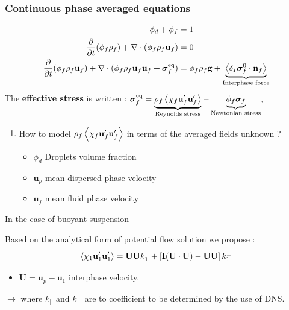 \documentclass{sintefbeamer}
\begin{document}
\begin{frame}
  \frametitle{Continuous phase averaged equations }
\begin{align*}
  \phi_d + \phi_f &= 1\\
  \frac{\partial}{\partial t} (\phi_f \rho_f)  
  + \mathbf{\nabla}\cdot (\phi_f \rho_f\textbf{u}_f)
  &= 
  0\\
  \frac{\partial}{\partial t} (\phi_f \rho_f\textbf{u}_f)  
  + \mathbf{\nabla}\cdot (
      \phi_f \rho_f\textbf{u}_f\textbf{u}_f
      + \bm{\sigma}_f^\text{eq}
  )
  &= 
  \phi_f  \rho_f \textbf{g}
  + 
  \underbrace{
    \left<\delta_I \bm{\sigma}_f^0 \cdot \textbf{n}_f\right>
  }_\text{Interphase force}
\end{align*}
The \textbf{effective stress} is written :
$
  \bm{\sigma}_f^\text{eq}
  = 
   \underbrace{\rho_f\left<\chi_f \textbf{u}_f'\textbf{u}_f'\right>}_\text{Reynolds stress}
    - \underbrace{\phi_f \bm{\sigma}_f}_\text{Newtonian stress},
$

\begin{enumerate}
  \item How to model $\rho_f\left<\chi_f \textbf{u}_f'\textbf{u}_f'\right>$ in terms of the averaged fields unknown ?
  \begin{itemize}
    \item $\phi_d$ Droplets volume fraction 
    \item $\textbf{u}_p$ mean dispersed phase velocity
    \item $\textbf{u}_f$ mean fluid phase velocity
  \end{itemize}
\end{enumerate}

\end{frame}




\begin{frame}
  {In the case of buoyant suspension}

  Based on the analytical form of potential flow solution we propose :
  \begin{equation*}
    \left<\chi_1 \textbf{u}_1'\textbf{u}_1'\right>
    = 
    \textbf{U}
    \textbf{U}
    k^{||}_1
    + 
    \left[
        \textbf{I} (\textbf{U}\cdot \textbf{U})
    -
    \textbf{U}
    \textbf{U}
    \right]
    k^{\bot}_1
\end{equation*}
\begin{itemize}
  \item $\textbf{U} = \textbf{u}_p - \textbf{u}_1$ interphase velocity. 
\end{itemize}
$\to$ where $k_{||}$ and $k^\bot$ are to coefficient to be determined by the use of DNS. 
\end{frame}
\end{document}
